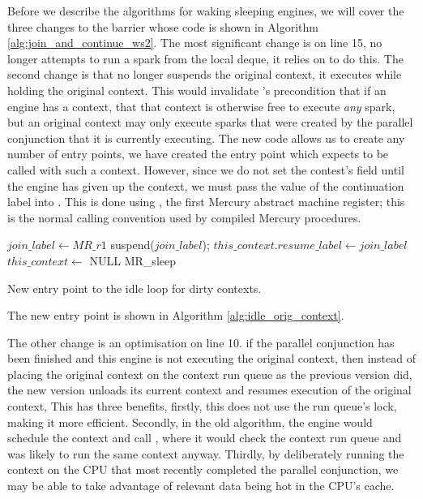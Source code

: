 Before we describe the algorithms for waking sleeping engines,
we will cover the three changes to the \joinandcontinue barrier
whose code is shown in Algorithm \ref{alg:join_and_continue_ws2}.
The most significant change is on line 15,
\joinandcontinue no longer attempts to run a spark from the local deque,
it relies on \idle to do this.
The second change is that \joinandcontinue no longer suspends the original
context, it executes \idle while holding the original context.
This would invalidate \idle's precondition that if an engine has a context,
that that context is otherwise free to execute \emph{any} spark,
but an original context may only execute sparks that were created by the
parallel conjunction that it is currently executing.
The new \idle code allows us to create any number of entry points,
we have created the \idleorigcontext entry point which expects to be called
with such a context.
However, since we do not set the contest's  field until
the engine has given up the context,
we must pass the value of the continuation label into \idleorigcontext.
This is done using , the first Mercury abstract machine
register;
this is the normal calling convention used by compiled Mercury procedures.

\begin{algorithm}
\begin{algorithmic}
        \State $join\_label \gets MR\_r1$
        \State {}
        \State suspend($join\_label$);
        \State $this\_context.resume\_label \gets join\_label$
        \State $this\_context \gets$ NULL
        \State {}
        \State {}
        \Goto MR\_sleep
    \EndProcedure
\end{algorithmic}
\caption{New entry point to the idle loop for dirty contexts.}
\label{alg:idle_orig_context}
\end{algorithm}

The new entry point \idleorigcontext is shown in Algorithm
\ref{alg:idle_orig_context}.

The other change is an optimisation on line 10.
if the parallel conjunction has been finished and this engine is not
executing the original context,
then instead of placing the original context on the context run queue as the
previous version did,
the new version unloads its current context and resumes execution of the
original context,
This has three benefits,
firstly, this does not use the run queue's lock,
making it more efficient.
Secondly, in the old algorithm, the engine would schedule the context and
call \idle,
where it would check the context run queue and was likely to run the same
context anyway.
Thirdly, by deliberately running the context on the CPU that most
recently completed the parallel conjunction,
we may be able to take advantage of relevant data being hot in the CPU's
cache.

